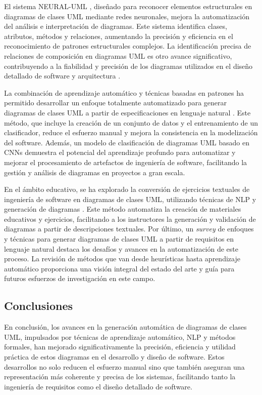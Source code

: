 El sistema NEURAL-UML \cite{Chu2020}, diseñado para reconocer elementos estructurales en diagramas de clases UML mediante redes neuronales, mejora la automatización del análisis e interpretación de diagramas. Este sistema identifica clases, atributos, métodos y relaciones, aumentando la precisión y eficiencia en el reconocimiento de patrones estructurales complejos. La identificación precisa de relaciones de composición en diagramas UML es otro avance significativo, contribuyendo a la fiabilidad y precisión de los diagramas utilizados en el diseño detallado de software y arquitectura \cite{Koenig2023}.

La combinación de aprendizaje automático y técnicas basadas en patrones ha permitido desarrollar un enfoque totalmente automatizado para generar diagramas de clases UML a partir de especificaciones en lenguaje natural \cite{Milanova2005}. Este método, que incluye la creación de un conjunto de datos y el entrenamiento de un clasificador, reduce el esfuerzo manual y mejora la consistencia en la modelización del software. Además, un modelo de clasificación de diagramas UML basado en CNNs \cite{Yang2022} demuestra el potencial del aprendizaje profundo para automatizar y mejorar el procesamiento de artefactos de ingeniería de software, facilitando la gestión y análisis de diagramas en proyectos a gran escala.

En el ámbito educativo, se ha explorado la conversión de ejercicios textuales de ingeniería de software en diagramas de clases UML, utilizando técnicas de NLP y generación de diagramas \cite{Wang2022}. Este método automatiza la creación de materiales educativos y ejercicios, facilitando a los instructores la generación y validación de diagramas a partir de descripciones textuales. Por último, un \textit{survey} de enfoques y técnicas para generar diagramas de clases UML a partir de requisitos en lenguaje natural \cite{Abdelnabi2021} destaca los desafíos y avances en la automatización de este proceso. La revisión de métodos que van desde heurísticas hasta aprendizaje automático proporciona una visión integral del estado del arte y guía para futuros esfuerzos de investigación en este campo.


\subsection{Conclusiones}

En conclusión, los avances en la generación automática de diagramas de clases UML, impulsados por técnicas de aprendizaje automático, NLP y métodos formales, han mejorado significativamente la precisión, eficiencia y utilidad práctica de estos diagramas en el desarrollo y diseño de software. Estos desarrollos no solo reducen el esfuerzo manual sino que también aseguran una representación más coherente y precisa de los sistemas, facilitando tanto la ingeniería de requisitos como el diseño detallado de software.

